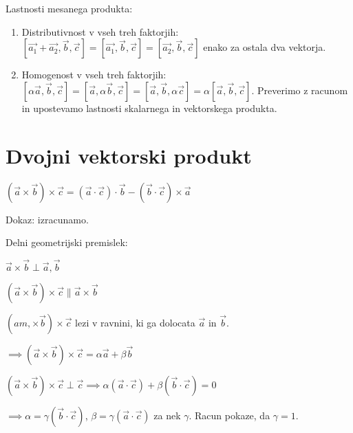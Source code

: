 \documentclass{report}
\begin{document}
Lastnosti mesanega produkta:

\begin{enumerate}
	\item Distributivnost v vseh treh faktorjih:
		$\left[ \vec{a_1} + \vec{a_2}, \vec{b}, \vec{c} \right] =  \left[  \vec{a_1},\vec{b}, \vec{c}  \right] = \left[  \vec{a_2} , \vec{b}, \vec{c} \right]  $
		enako za ostala dva vektorja.
	\item Homogenost v vseh treh faktorjih: $\left[  \alpha \vec{a}, \vec{b} , \vec{c}  \right] = \left[  \vec{a}, \alpha \vec{b}, \vec{c}  \right] = \left[  \vec{a}, \vec{b} , \alpha \vec{c}  \right]   = \alpha \left[  \vec{a} , \vec{b} , \vec{c}  \right] $. Preverimo z racunom in upostevamo lastnosti skalarnega in vektorskega produkta.
\end{enumerate}


\section{Dvojni vektorski produkt}

$ \left( \vec{a} \times \vec{b} \right) \times \vec{c} = \left( \vec{a} \cdot \vec{c} \right) \cdot \vec{b} - \left( \vec{b} \cdot \vec{c} \right) \times \vec{a} $


Dokaz: izracunamo.

Delni geometrijski premislek:

$\vec{a} \times \vec{b} \perp \vec{a}, \vec{b}$

$\left(\vec{a} \times \vec{b} \right) \times \vec{c} \parallel \vec{a} \times \vec{b}$

$\left( am, \times \vec{b} \right) \times \vec{c}$ lezi v ravnini, ki ga dolocata $\vec{a}$ in $\vec{b}$.

$\implies \left( \vec{a} \times \vec{b} \right) \times \vec{c}  = \alpha \vec{a} + \beta \vec{b}$


$\left( \vec{a} \times \vec{b} \right) \times \vec{c} \perp \vec{c}  \implies \alpha \left( \vec{a} \cdot \vec{c} \right) + \beta \left( \vec{b} \cdot \vec{c} \right) = 0 $

$\implies \alpha = \gamma \left( \vec{b} \cdot \vec{c} \right) $, $\beta = \gamma \left( \vec{a} \cdot \vec{c} \right) $ za nek $\gamma$. Racun pokaze, da $\gamma = 1$.
\end{document}
